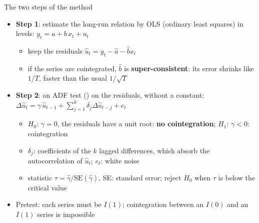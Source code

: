 \begin{frame}{The two steps of the method}
\itemsize{\small}
\begin{itemize}
    \item \textbf{Step 1}: estimate the long-run relation by OLS (ordinary least squares) in levels: $y_t = a + b\,x_t + u_t$
    \begin{itemize}
        \item keep the residuals $\hat u_t = y_t - \hat a - \hat b x_t$
        \item if the series are cointegrated, $\hat b$ is \textbf{super-consistent}: its error shrinks like $1/T$, faster than the usual $1/\sqrt{T}$
    \end{itemize}
    \item \textbf{Step 2}: an ADF test () on the residuals, without a constant: $\Delta\hat u_t = \gamma\,\hat u_{t-1} + \sum_{j=1}^{k}\delta_j\Delta\hat u_{t-j} + e_t$
    \begin{itemize}
        \item $H_0$: $\gamma = 0$, the residuals have a unit root: \textbf{no cointegration}; $H_1$: $\gamma < 0$: cointegration
        \item $\delta_j$: coefficients of the $k$ lagged differences, which absorb the autocorrelation of $\hat u_t$; $e_t$: white noise
        \item statistic $\tau = \hat\gamma/\mathrm{SE}(\hat\gamma)$, SE: standard error; reject $H_0$ when $\tau$ is below the critical value
    \end{itemize}
    \item Pretest: each series must be $I(1)$; cointegration between an $I(0)$ and an $I(1)$ series is impossible
\end{itemize}
\end{frame}

